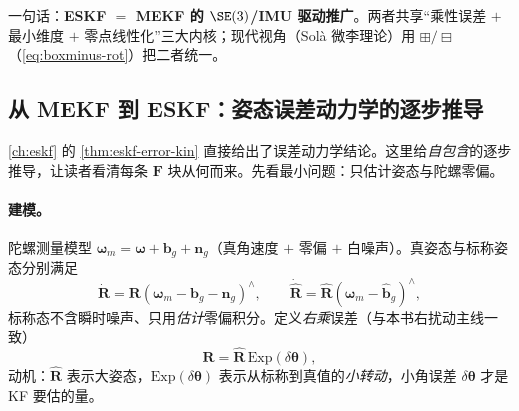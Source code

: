 \noindent{}一句话：\textbf{ESKF $=$ MEKF 的 $\SE(3)$/IMU 驱动推广}。两者共享“乘性误差 $+$ 最小维度 $+$ 零点线性化”三大内核；现代视角（Solà 微李理论\cite{sola2018micro}）用 $\boxplus/\boxminus$（\cref{eq:boxminus-rot}）把二者统一。

\subsection{从 MEKF 到 ESKF：姿态误差动力学的逐步推导}
\label{subsec:mekf-to-eskf}

\cref{ch:eskf} 的 \cref{thm:eskf-error-kin} 直接给出了误差动力学结论。这里给\emph{自包含}的逐步推导，让读者看清每条 $\mathbf{F}$ 块从何而来。先看最小问题：只估计姿态与陀螺零偏。

\paragraph{建模。}陀螺测量模型 $\boldsymbol{\omega}_m=\boldsymbol{\omega}+\mathbf{b}_g+\mathbf{n}_g$（真角速度 $+$ 零偏 $+$ 白噪声）。真姿态与标称姿态分别满足
\begin{equation}
  \dot{\mathbf{R}}=\mathbf{R}(\boldsymbol{\omega}_m-\mathbf{b}_g-\mathbf{n}_g)^\wedge,\qquad
  \dot{\hat{\mathbf{R}}}=\hat{\mathbf{R}}(\boldsymbol{\omega}_m-\hat{\mathbf{b}}_g)^\wedge,
  \label{eq:mekf-true-nominal}
\end{equation}
标称态不含瞬时噪声、只用\emph{估计}零偏积分。定义\emph{右乘}误差（与本书右扰动主线一致）
\begin{equation}
  \mathbf{R}=\hat{\mathbf{R}}\,\mathrm{Exp}(\delta\boldsymbol{\theta}),
  \label{eq:mekf-err-def}
\end{equation}
动机：$\hat{\mathbf{R}}$ 表示大姿态，$\mathrm{Exp}(\delta\boldsymbol{\theta})$ 表示从标称到真值的\emph{小转动}，小角误差 $\delta\boldsymbol{\theta}$ 才是 KF 要估的量。


